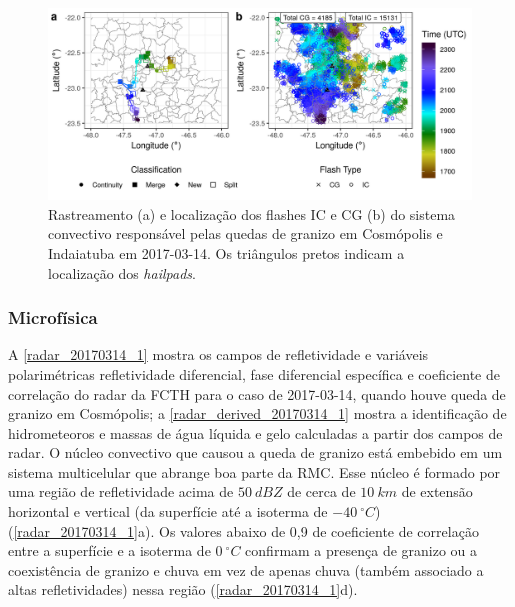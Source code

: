 \begin{figure}[htb]
	\begin{center}
		\caption{Rastreamento (a) e localização dos flashes IC e CG (b) do sistema convectivo responsável pelas quedas de granizo em Cosmópolis e Indaiatuba em 2017-03-14. Os triângulos pretos indicam a localização dos \textit{hailpads}.} 
		\label{track_flashes_20170314}
		\includegraphics[width=\columnwidth]{../General_Processing/figures/track_flashes_20170314.png}
	\end{center}
\end{figure}

\subsubsection{Microfísica}\label{micro_201703014}

A \autoref{radar_20170314_1} mostra os campos de refletividade e variáveis polarimétricas refletividade diferencial, fase diferencial específica e coeficiente de correlação do radar da FCTH para o caso de 2017-03-14, quando houve queda de granizo em Cosmópolis; a \autoref{radar_derived_20170314_1} mostra a identificação de hidrometeoros e massas de água líquida e gelo calculadas a partir dos campos de radar. O núcleo convectivo que causou a queda de granizo está embebido em um sistema multicelular que abrange boa parte da RMC. Esse núcleo é formado por uma região de refletividade acima de $50\:dBZ$ de cerca de $10\:km$ de extensão horizontal e vertical (da superfície até a isoterma de $-40\:^{\circ}C$) (\autoref{radar_20170314_1}a). Os valores abaixo de 0,9 de coeficiente de correlação entre a superfície e a isoterma de $0\:^{\circ}C$ confirmam a presença de granizo ou a coexistência de granizo e chuva em vez de apenas chuva (também associado a altas refletividades) nessa região (\autoref{radar_20170314_1}d).

